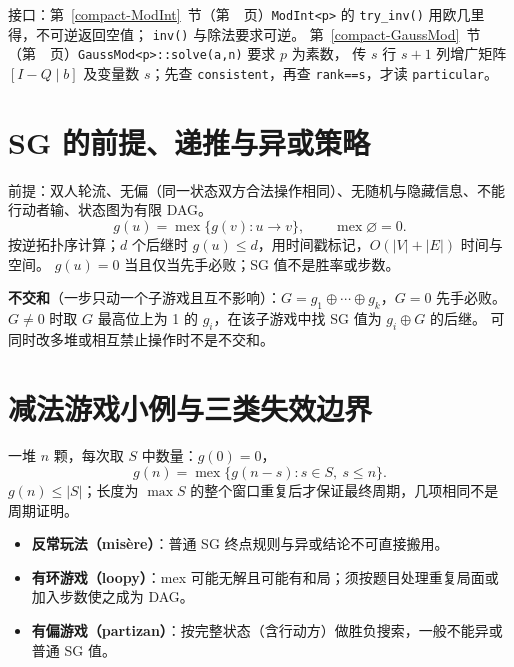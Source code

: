 接口：第~\ref{compact-ModInt}~节（第~\pageref{compact-ModInt}~页）\texttt{ModInt<p>} 的 \texttt{try\_inv()} 用欧几里得，不可逆返回空值；
\texttt{inv()} 与除法要求可逆。
第~\ref{compact-GaussMod}~节（第~\pageref{compact-GaussMod}~页）\texttt{GaussMod<p>::solve(a,n)} 要求 $p$ 为素数，
传 $s$ 行 $s+1$ 列增广矩阵 $[I-Q\mid b]$ 及变量数 $s$；先查 \texttt{consistent}，再查 \texttt{rank==s}，才读 \texttt{particular}。

\section{SG 的前提、递推与异或策略}\label{knowledge-sg}
前提：双人轮流、无偏（同一状态双方合法操作相同）、无随机与隐藏信息、不能行动者输、状态图为有限 DAG。
\[
g(u)=\operatorname{mex}\{g(v):u\to v\},\qquad
\operatorname{mex}\varnothing=0.
\]
按逆拓扑序计算；$d$ 个后继时 $g(u)\le d$，用时间戳标记，$O(|V|+|E|)$ 时间与空间。
$g(u)=0$ 当且仅当先手必败；SG 值不是胜率或步数。

\textbf{不交和}（一步只动一个子游戏且互不影响）：$G=g_1\oplus\cdots\oplus g_k$，$G=0$ 先手必败。
$G\ne0$ 时取 $G$ 最高位上为 1 的 $g_i$，在该子游戏中找 SG 值为 $g_i\oplus G$ 的后继。
可同时改多堆或相互禁止操作时不是不交和。

\section{减法游戏小例与三类失效边界}\label{knowledge-subtraction-game}
一堆 $n$ 颗，每次取 $S$ 中数量：$g(0)=0$，
\[
g(n)=\operatorname{mex}\{g(n-s):s\in S,\ s\le n\}.
\]
$g(n)\le|S|$；长度为 $\max S$ 的整个窗口重复后才保证最终周期，几项相同不是周期证明。
\begin{itemize}
\item \textbf{反常玩法（mis\`ere）}：普通 SG 终点规则与异或结论不可直接搬用。
\item \textbf{有环游戏（loopy）}：mex 可能无解且可能有和局；须按题目处理重复局面或加入步数使之成为 DAG。
\item \textbf{有偏游戏（partizan）}：按完整状态（含行动方）做胜负搜索，一般不能异或普通 SG 值。
\end{itemize}

\label{end-probability-games-supplement}

